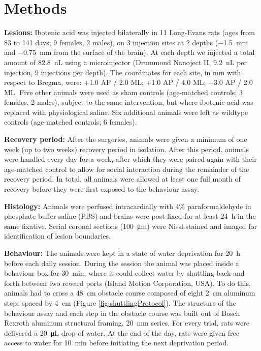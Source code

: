 \section{Methods}

\textbf{Lesions:} Ibotenic acid was injected bilaterally in 11 Long-Evans rats (ages from 83 to 141 days; 9 females, 2 males), on 3 injection sites at 2 depths (\SI{-1.5}{\milli\meter} and \SI{-0.75}{\milli\meter} from the surface of the brain). At each depth we injected a total amount of \SI{82.8}{\nano\liter} using a microinjector (Drummond Nanoject II, \SI{9.2}{\nano\liter} per injection, 9 injections per depth). The coordinates for each site, in \si{\milli\meter} with respect to Bregma, were: +1.0 AP / 2.0 ML; +1.0 AP / 4.0 ML; +3.0 AP / 2.0 ML. Five other animals were used as sham controls (age-matched controls; 3 females, 2 males), subject to the same intervention, but where ibotenic acid was replaced with physiological saline. Six additional animals were left as wildtype controls (age-matched controls; 6 females).

\textbf{Recovery period:} After the surgeries, animals were given a minimum of one week (up to two weeks) recovery period in isolation. After this period, animals were handled every day for a week, after which they were paired again with their age-matched control to allow for social interaction during the remainder of the recovery period. In total, all animals were allowed at least one full month of recovery before they were first exposed to the behaviour assay.

\textbf{Histology:} Animals were perfused intracardially with 4\% paraformaldehyde in phosphate buffer saline (PBS) and brains were post-fixed for at least \SI{24}{\hour} in the same fixative. Serial coronal sections (\SI{100}{\micro\meter}) were Nissl-stained and imaged for identification of lesion boundaries.

\textbf{Behaviour:} The animals were kept in a state of water deprivation for \SI{20}{\hour} before each daily session. During the session the animal was placed inside a behaviour box for \SI{30}{\minute}, where it could collect water by shuttling back and forth between two reward ports (Island Motion Corporation, USA). To do this, animals had to cross a \SI{48}{\centi\meter} obstacle course composed of eight \SI{2}{\centi\meter} aluminum steps spaced by \SI{4}{\centi\meter} (Figure \ref{fig:shuttlingProtocol}). The structure of the behaviour assay and each step in the obstacle course was built out of Bosch Rexroth aluminum structural framing, \SI{20}{\milli\meter} series. For every trial, rats were delivered a \SI{20}{\micro\liter} drop of water. At the end of the day, rats were given free access to water for \SI{10}{\minute} before initiating the next deprivation period.

